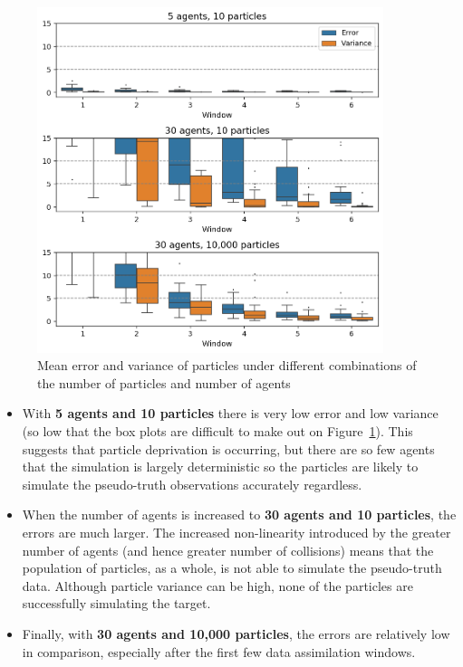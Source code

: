\begin{figure}[ht]
	\centering
	\includegraphics[width=0.9\textwidth]{figures/results/variance_results}
	\caption{Mean error and variance of particles under different combinations of the number of particles and number of agents}\label{fig:variance_results}
\end{figure}

\begin{itemize}
    \item With \textbf{5 agents and 10 particles} there is very low error and low variance (so low that the box plots are difficult to make out on Figure~\ref{fig:variance_results}). This suggests that particle deprivation is occurring, but there are so few agents that the simulation is largely deterministic so the particles are likely to simulate the pseudo-truth observations accurately regardless.
    \item When the number of agents is increased to \textbf{30 agents and 10 particles}, the errors are much larger. The increased non-linearity introduced by the greater number of agents (and hence greater number of collisions) means that the population of particles, as a whole, is not able to simulate the pseudo-truth data. Although particle variance can be high, none of the particles are successfully simulating the target.
    \item Finally, with \textbf{30 agents and 10,000 particles}, the errors are relatively low in comparison, especially after the first few data assimilation windows. 
\end{itemize}





